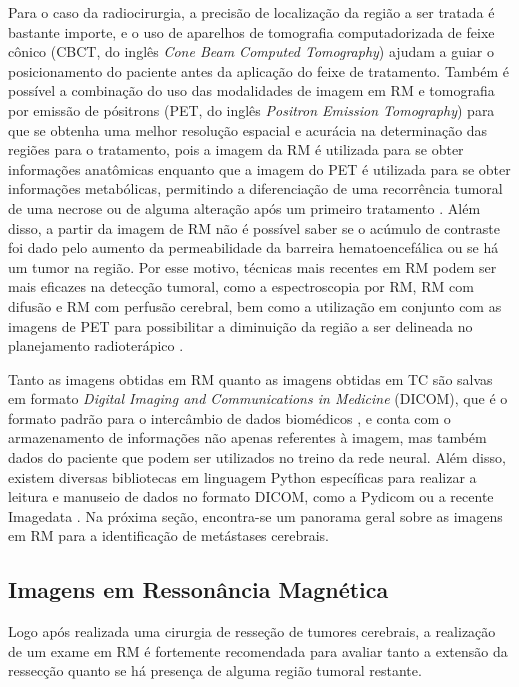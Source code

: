 Para o caso da radiocirurgia, a precisão de localização da região a ser tratada é bastante importe, e o uso de aparelhos de tomografia computadorizada de feixe cônico (CBCT, do inglês \textit{Cone Beam Computed Tomography}) ajudam a guiar o posicionamento do paciente antes da aplicação do feixe de tratamento. Também é possível a combinação do uso das modalidades de imagem em RM e tomografia por emissão de pósitrons (PET, do inglês \textit{Positron Emission Tomography}) para que se obtenha uma melhor resolução espacial e acurácia na determinação das regiões para o tratamento, pois a imagem da RM é utilizada para se obter informações anatômicas enquanto que a imagem do PET é utilizada para se obter informações metabólicas, permitindo a diferenciação de uma recorrência tumoral de uma necrose \cite{Mori:2006} ou de alguma alteração após um primeiro tratamento \cite{Castellano:2021}. Além disso, a partir da imagem de RM não é possível saber se o acúmulo de contraste foi dado pelo aumento da permeabilidade da barreira hematoencefálica ou se há um tumor na região. Por esse motivo, técnicas mais recentes em RM podem ser mais eficazes na detecção tumoral, como a espectroscopia por RM, RM com difusão e RM com perfusão cerebral, bem como a utilização em conjunto com as imagens de PET para possibilitar a diminuição da região a ser delineada no planejamento radioterápico \cite{Castellano:2021}.

Tanto as imagens obtidas em RM quanto as imagens obtidas em TC são salvas em formato \textit{Digital Imaging and Communications in Medicine} (DICOM), que é o formato padrão para o intercâmbio de dados biomédicos \cite{Bidgood:1997}, e conta com o armazenamento de informações não apenas referentes à imagem, mas também dados do paciente que podem ser utilizados no treino da rede neural. Além disso, existem diversas bibliotecas em linguagem Python específicas para realizar a leitura e manuseio de dados no formato DICOM, como a Pydicom \cite{Mason:2011} ou a recente Imagedata \cite{Andersen:2022}. Na próxima seção, encontra-se um panorama geral sobre as imagens em RM para a identificação de metástases cerebrais.


\subsection{Imagens em Ressonância Magnética}

Logo após realizada uma cirurgia de resseção de tumores cerebrais, a realização de um exame em RM é fortemente recomendada \cite{Garcia-Ruiz:2021} para avaliar tanto a extensão da ressecção quanto se há presença de alguma região tumoral restante.

